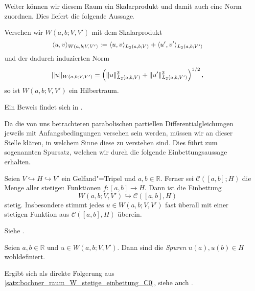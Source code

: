 \documentclass[../main.tex]{subfiles}
\begin{document}
Weiter können wir diesem Raum ein Skalarprodukt und damit auch eine Norm zuordnen.
Dies liefert die folgende Aussage.

\begin{Lemma}
\label{lemma:bochner_W_ist_hilbertraum}
    Versehen wir $W(a, b; V, V')$ mit dem Skalarprodukt
    \begin{equation}
        \langle u,v\rangle_{W(a, b; V, V')} := \langle u,v\rangle_{L_{2}(a, b; V)} + \langle u',v'\rangle_{L_{2}(a, b; V')}
    \end{equation}
    und der dadurch induzierten Norm
    \begin{equation}
        \lVert u\rVert_{W(a, b; V, V')} = \left( \lVert u\rVert_{L_{2}(a, b; V)}^{2} + \lVert u'\rVert_{L_{2}(a, b; V')}^{2} \right)^{1/2},
    \end{equation}
    so ist $W(a, b; V, V')$ ein Hilbertraum.

    \begin{Beweis}
        Ein Beweis findet sich in \cite[Proposition XVIII.2.6]{Dautray:1992by}.
    \end{Beweis}
\end{Lemma}

Da die von uns betrachteten parabolischen partiellen Differentialgleichungen jeweils mit Anfangsbedingungen versehen sein werden, müssen wir an dieser Stelle klären, in welchem Sinne diese zu verstehen sind.
Dies führt zum sogenannten Spursatz, welchen wir durch die folgende Einbettungsaussage erhalten.

\begin{Satz}
\label{satz:bochner_raum_W_stetige_einbettung_C0}
    Seien $V \hookrightarrow H \hookrightarrow V'$ ein Gelfand"=Tripel und $a, b \in \mathbb{R}$.
    Ferner sei $\mathcal C([a, b]; H)$ die Menge aller stetigen Funktionen $f \colon [a, b] \to H$.
    Dann ist die Einbettung
    \begin{equation}
        W(a, b; V, V') \hookrightarrow \mathcal C([a, b], H)
    \end{equation}
    stetig.
    Insbesondere stimmt jedes $u \in W(a, b; V, V')$ fast überall mit einer stetigen Funktion aus $\mathcal C([a, b], H)$ überein.

    \begin{Beweis}
        Siehe \cites[Theorem XVIII.2.1]{Dautray:1992by}[Theorem 10.9]{Schweizer2013}.
    \end{Beweis}
\end{Satz}

\begin{Korollar}[Spursatz]
\label{korollar:spursatz}
    Seien $a, b \in \mathbb{R}$ und $u \in W(a, b; V, V')$.
    Dann sind die \emph{Spuren} $u(a), u(b) \in H$ wohldefiniert.

    \begin{Beweis}
        Ergibt sich als direkte Folgerung aus \cref{satz:bochner_raum_W_stetige_einbettung_C0}, siehe auch \cite[Remark XVIII.2.4]{Dautray:1992by}.
    \end{Beweis}
\end{Korollar}
\end{document}
